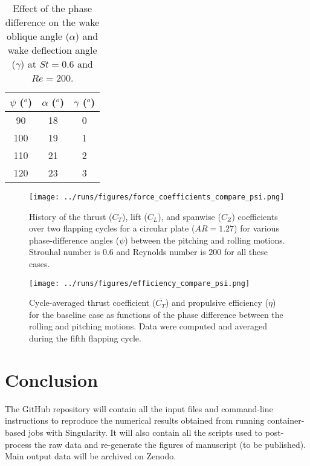 \begin{table}
  \centering
  \begin{tabular}{ccc}
    \hline\hline
    $\psi$ ($^o$) & $\alpha$ ($^o$) & $\gamma$ ($^o$) \\
    \hline
    90 & 18 & 0 \\
    100 & 19 & 1 \\
    110 & 21 & 2 \\
    120 & 23 & 3 \\
    \hline\hline
  \end{tabular}
  \caption{Effect of the phase difference on the wake oblique angle ($\alpha$) and wake deflection angle ($\gamma$) at $St = 0.6$ and $Re = 200$.}
  \label{tab:phase_angles}
\end{table}

\begin{figure}
  \centering
  \texttt{[image: ../runs/figures/force\_coefficients\_compare\_psi.png]}
  \caption{History of the thrust ($C_T$), lift ($C_L$), and spanwise ($C_Z$) coefficients over two flapping cycles for a circular plate ($AR = 1.27$) for various phase-difference angles ($\psi$) between the pitching and rolling motions. Strouhal number is $0.6$ and Reynolds number is $200$ for all these cases.}
  \label{fig:phase_force_coefficients}
\end{figure}

\begin{figure}
  \centering
  \texttt{[image: ../runs/figures/efficiency\_compare\_psi.png]}
  \caption{Cycle-averaged thrust coefficient ($\overline{C_T}$) and propulsive efficiency ($\eta$) for the baseline case as functions of the phase difference between the rolling and pitching motions. Data were computed and averaged during the fifth flapping cycle.}
  \label{fig:phase_efficiency}
\end{figure}

\section{Conclusion}

The GitHub repository will contain all the input files and command-line instructions to reproduce the numerical results obtained from running container-based jobs with Singularity.
It will also contain all the scripts used to post-process the raw data and re-generate the figures of manuscript (to be published).
Main output data will be archived on Zenodo.
